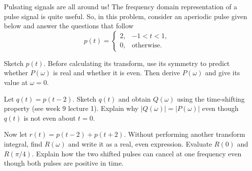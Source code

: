 \documentclass{ee102_pset}
\author{\rule{3cm}{0.4pt}}
\begin{document}





 Pulsating signals are all around us! The frequency domain representation of a pulse signal is quite useful. So, in this problem, consider an aperiodic pulse given below and answer the questions that follow
\[
p(t)=
\begin{cases}
2,&-1<t<1,\\
0,&\text{otherwise}.
\end{cases}
\]

\problempart[30 points] Sketch $p(t)$. Before calculating its transform,
use its symmetry to predict whether $P(\omega)$ is real and whether it is
even. Then derive $P(\omega)$ and give its value at $\omega=0$.


\problempart[40 points] Let $q(t)=p(t-2)$. Sketch $q(t)$ and obtain
$Q(\omega)$ using the time-shifting property (see week 9 lecture 1). Explain why
$|Q(\omega)|=|P(\omega)|$ even though $q(t)$ is not even about $t=0$.


\problempart[30 points] Now let $r(t)=p(t-2)+p(t+2)$. Without performing
another transform integral, find $R(\omega)$ and write it as a real,
even expression. Evaluate $R(0)$ and $R(\pi/4)$. Explain how the two
shifted pulses can cancel at one frequency even though both pulses
are positive in time.
\end{document}
